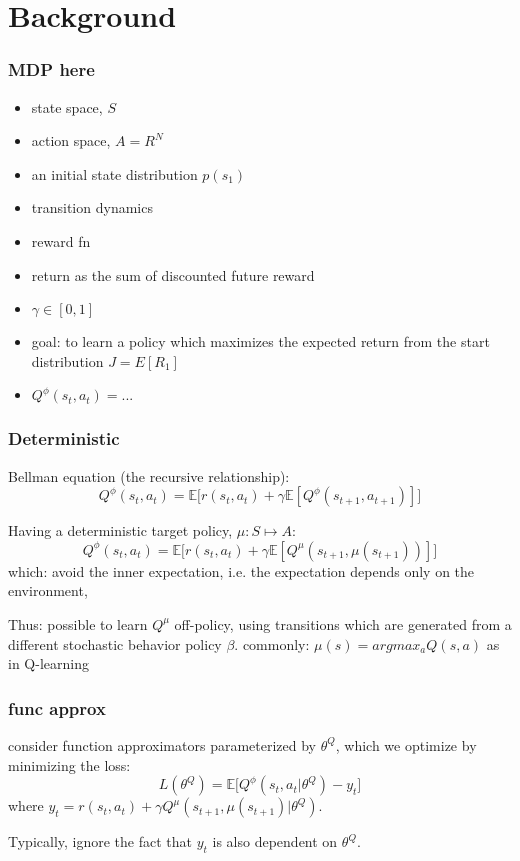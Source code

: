 \section{Background}

\begin{frame}
\frametitle{MDP here}
\begin{itemize}
  \item state space, $S$
  \item action space, $A = R^N$
  \item an initial state distribution $p(s_1)$
  \item transition dynamics
  \item reward fn
  \item return as the sum of discounted future reward
  \item $\gamma \in [0,1]$
  \item goal: to learn a policy which maximizes the expected return from
  the start distribution $J = E[R_1]$
  \item $Q^{\phi}(s_t,a_t) = ...$
\end{itemize}
\end{frame}

\begin{frame}
\frametitle{Deterministic}
Bellman equation (the recursive relationship):
\begin{equation}
Q^{\phi} (s_t,a_t) = \mathbb{E} \Big[ r(s_t,a_t) + \gamma \mathbb{E} [Q^{\phi}(s_{t+1},a_{t+1})] \Big]
\end{equation}

Having a deterministic target policy, $\mu: S \mapsto A$:
\begin{equation}
Q^{\phi} (s_t,a_t) = \mathbb{E} \Big[ r(s_t,a_t) + \gamma \mathbb{E} [Q^{\mu}(s_{t+1},\mu(s_{t+1}))] \Big]
\end{equation}
which:
avoid the inner expectation, i.e.
the expectation depends only on the environment,

Thus: possible to learn $Q^{\mu}$ off-policy,
using transitions which are generated from a different stochastic behavior policy $\beta$.
commonly: $\mu(s) = argmax_a Q(s,a)$ as in Q-learning
\end{frame}

\begin{frame}
\frametitle{func approx}
consider function approximators parameterized by $\theta^Q$, which we optimize by minimizing the loss:
\begin{equation*}
L(\theta^Q) =\mathbb{E} \Big[ Q^{\phi} (s_t,a_t|\theta^Q) - y_t \Big]
\end{equation*}
where $y_t = r(s_t,a_t) + \gamma Q^{\mu}(s_{t+1},\mu(s_{t+1}) | \theta^Q)$.

Typically, ignore the fact that $y_t$ is also dependent on $\theta^Q$.

\end{frame}


